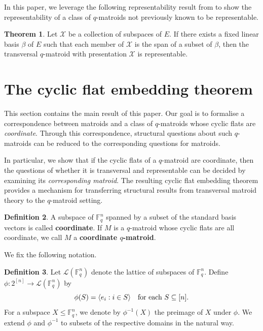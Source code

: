 \documentclass{article}
\theoremstyle{definition}
\newtheorem{theorem}{Theorem}[section]
\newtheorem{definition}[theorem]{{{Definition}}}
\begin{document}
In this paper, we leverage the following representability result from \cite{saaltink2025theoryqtransversals} to show the representability of a class of $q$-matroids not previously known to be representable.

\begin{theorem}\label{thm:saaltink_representable}\cite[Theorem 24]{saaltink2025theoryqtransversals}
    Let $\mathcal{X}$ be a collection of subspaces of $E$. If there exists a fixed linear basis $\beta$ of $E$ such that each member of $\mathcal{X}$ is the span of a subset of $\beta$, then the transversal $q$-matroid with presentation $\mathcal{X}$ is representable.
\end{theorem}

\section{The cyclic flat embedding theorem}

This section contains the main result of this paper. Our goal is to formalise a correspondence between matroids and a class of $q$-matroids whose cyclic flats are \emph{coordinate}. Through this correspondence, structural questions about such $q$-matroids can be reduced to the corresponding questions for matroids.

In particular, we show that if the cyclic flats of a $q$-matroid are coordinate, then the questions of whether it is transversal and representable can be decided by examining its \emph{corresponding matroid}. The resulting cyclic flat embedding theorem provides a mechanism for transferring structural results from transversal matroid theory to the $q$-matroid setting.

\begin{definition}
    A subspace of $\mathbb{F}_q^n$ spanned by a subset of the standard basis vectors is called \textbf{coordinate}. If $M$ is a $q$-matroid whose cyclic flats are all coordinate, we call $M$ a \textbf{coordinate $q$-matroid}.
\end{definition}

We fix the following notation.

\begin{definition}
    Let $\mathcal{L}(\mathbb{F}_q^n)$ denote the lattice of subspaces of $\mathbb{F}_q^n$. Define $\phi:2^{[n]}\to\mathcal{L}(\mathbb{F}_q^n)$ by 
    $$\phi(S)=\langle e_i:i\in S\rangle\quad \textup{for each } S\subseteq[n].$$ 
    For a subspace $X\leq\mathbb{F}_q^n$, we denote by $\phi^{-1}(X)$ the preimage of $X$ under $\phi$. We extend $\phi$ and $\phi^{-1}$ to subsets of the respective domains in the natural way.
\end{definition}
\end{document}

